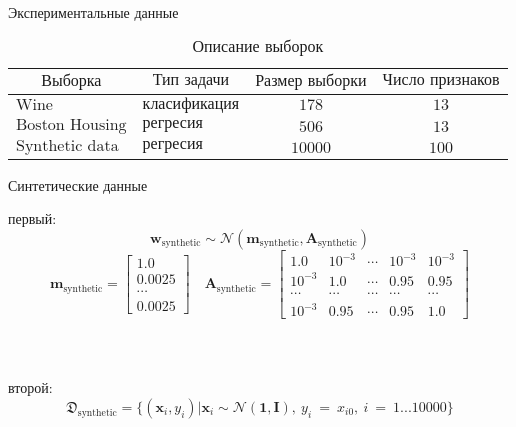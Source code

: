 \documentclass[10pt]{beamer}
\begin{document}
\begin{frame}{Экспериментальные данные}

{
\fontsize{8}{10}
\begin{table}[h]
\begin{center}
\caption{$\text{Описание выборок}$}
\begin{tabular}{|c|c|c|c|}
\hline
	$\text{Выборка}$ & $\text{Тип задачи}$ & $\text{Размер выборки}$ & $\text{Число признаков}$\\
	\hline
	
	\multicolumn{1}{|l|}{$\text{Wine}$}
	&
	\multicolumn{1}{|l|}{$\text{класификация}$}
	 & $178$ & $13$\\
	\hline
	
	\multicolumn{1}{|l|}{$\text{Boston Housing}$}
	&
	\multicolumn{1}{|l|}{$\text{регресия}$}
	& $506$ & $13$\\
	\hline
	\multicolumn{1}{|l|}{$\text{Synthetic data}$}
	&
	\multicolumn{1}{|l|}{$\text{регресия}$}
	& $10000$ & $100$\\
\hline

\end{tabular}
\end{center}
\end{table}
}
\end{frame}

\begin{frame}{Синтетические данные}


{ первый:}
$$\mathbf{w}_{\text{synthetic}}  \sim \mathcal{N}(\textbf{m}_{\text{synthetic}}, \textbf{A}_{\text{synthetic}})$$
$$\textbf{m}_{\text{synthetic}} = \begin{bmatrix}
1.0\\
0.0025\\
\cdots\\
0.0025
\end{bmatrix}
\quad
\textbf{A}_{\text{synthetic}} = \begin{bmatrix}
1.0& 10^{-3}& \cdots& 10^{-3}& 10^{-3}\\
10^{-3}& 1.0& \cdots& 0.95& 0.95\\
\cdots&\cdots&\cdots&\cdots&\cdots\\
10^{-3}& 0.95& \cdots& 0.95& 1.0
\end{bmatrix}$$\\
~\\
~\\
{ второй:}
$$\mathfrak{D}_{\text{synthetic}} = \{(\textbf{x}_i,y_i)| \textbf{x}_i \sim  \mathcal{N}(\textbf{1}, \textbf{I}),~y_i~=~x_{i0},~i~=~1 ... 10000\}$$

\end{frame}
\end{document}
